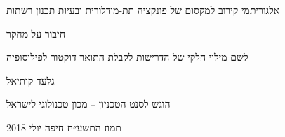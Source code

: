 \begin{hebrew}
\begin{center}

{\Huge אלגוריתמי קירוב למקסום של פונקציה תת-מודלורית ובעיות תכנון רשתות}


{\Large חיבור על מחקר}


\parbox{30em}{
\begin{center}
לשם מילוי חלקי של הדרישות לקבלת התואר
דוקטור לפילוסופיה
\end{center}
}


{\huge גלעד קותיאל}


הוגש לסנט הטכניון – מכון טכנולוגי לישראל

תמוז התשע״ח חיפה יולי 2018
\end{center}
\end{hebrew}
